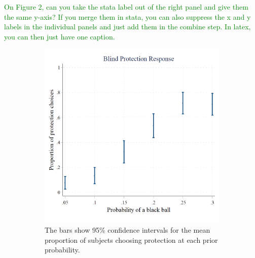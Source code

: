 \documentclass[12pt,a4paper]{article}
\begin{document}
\textcolor{green}{On Figure 2, can you take the stata label out of the right panel and give them the same y-axis?  If you merge them in stata, you can also suppress the x and y labels in the individual panels and just add them in the combine step.  In latex, you can then just have one caption.}
\begin{figure}[H]
\centering
\caption{Average Protection Response} \label{fig:ProtResponse}
\begin{subfigure}[t]{.45\textwidth}
  \centering
\includegraphics[width=\textwidth]{Graphs/blind_prot_sta.png}
\caption{The bars show 95\% confidence intervals for the mean proportion of subjects choosing protection at each prior probability.}
\end{subfigure}
\begin{subfigure}[t]{.45\textwidth}

\end{subfigure}
\end{figure}
\end{document}
